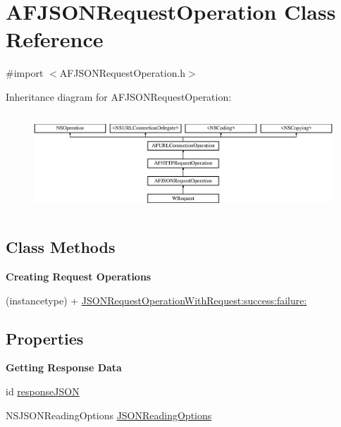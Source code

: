 \hypertarget{interface_a_f_j_s_o_n_request_operation}{\section{A\-F\-J\-S\-O\-N\-Request\-Operation Class Reference}
\label{interface_a_f_j_s_o_n_request_operation}
}


{\ttfamily \#import $<$A\-F\-J\-S\-O\-N\-Request\-Operation.\-h$>$}

Inheritance diagram for A\-F\-J\-S\-O\-N\-Request\-Operation\-:\begin{figure}[H]
\begin{center}
\leavevmode
\includegraphics[height=3.723404cm]{interface_a_f_j_s_o_n_request_operation}
\end{center}
\end{figure}
\subsection*{Class Methods}
\begin{Indent}{\bf Creating Request Operations}\par
{\em 

 

 }\begin{DoxyCompactItemize}
\item 
(instancetype) + \hyperlink{interface_a_f_j_s_o_n_request_operation_a89042addd43aacda57f24036359bdb09}{J\-S\-O\-N\-Request\-Operation\-With\-Request\-:success\-:failure\-:}
\end{DoxyCompactItemize}
\end{Indent}
\subsection*{Properties}
\begin{Indent}{\bf Getting Response Data}\par
{\em 

 

 }\begin{DoxyCompactItemize}
\item 
id \hyperlink{interface_a_f_j_s_o_n_request_operation_a1bc9c9b08f780373ace7eb34b1ae8149}{response\-J\-S\-O\-N}
\item 
N\-S\-J\-S\-O\-N\-Reading\-Options \hyperlink{interface_a_f_j_s_o_n_request_operation_a18f86ed904ccb70223a950ae5449a45b}{J\-S\-O\-N\-Reading\-Options}
\end{DoxyCompactItemize}
\end{Indent}
